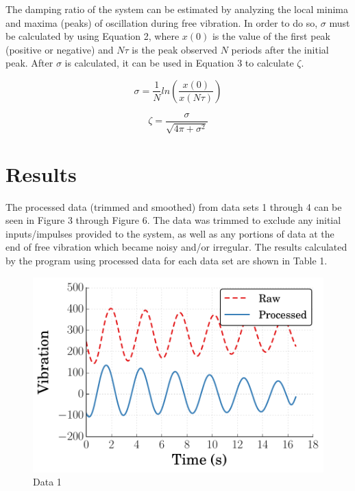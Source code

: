 \documentclass[11pt]{article}
\begin{document}
\bigskip

The damping ratio of the system can be estimated by analyzing the local minima and maxima (peaks) of oscillation during free vibration. In order to do so, $\sigma$ must be calculated by using Equation 2, where $x(0)$ is the value of the first peak (positive or negative) and $N\tau$ is the peak observed $N$ periods after the initial peak. After $\sigma$ is calculated, it can be used in Equation 3 to calculate $\zeta$. 

\begin{equation}
\sigma = \frac{1}{N}ln\left(\frac{x(0)}{x(N\tau)}\right)
\label{eqn:example2}
\end{equation}

\bigskip

\begin{equation}
\zeta = \frac{\sigma}{\sqrt{4\pi+\sigma^2}}
\label{eqn:example2}
\end{equation}



\section{Results}
\label{sec:section_2_label}
\vspace{-0.2in}
%

The processed data (trimmed and smoothed) from data sets 1 through 4 can be seen in Figure 3 through Figure 6. The data was trimmed to exclude any initial inputs/impulses provided to the system, as well as any portions of data at the end of free vibration which became noisy and/or irregular. The results calculated by the program using processed data for each data set are shown in Table 1. 

\newpage

\begin{figure}[h!] %
   \centering
   \includegraphics[width=5in]{vibration_data1.pdf} 
   \caption{Data 1}
   \label{fig:example}
\end{figure}
\end{document}
